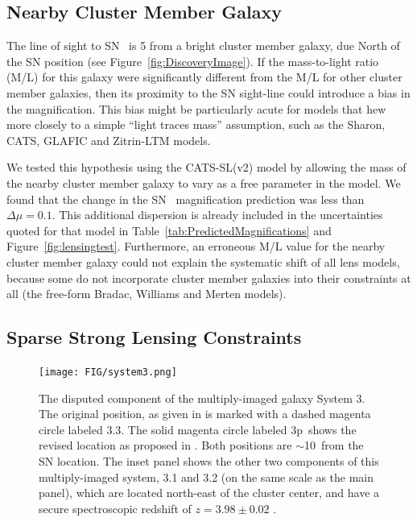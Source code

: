 \subsection{Nearby Cluster Member Galaxy}
\label{sec:NearbyClusterMemberGalaxy}

The line of sight to SN \tomas\ is 5 from a bright cluster
member galaxy, due North of the SN position (see
Figure~\ref{fig:DiscoveryImage}).  If the mass-to-light ratio (M/L)
for this galaxy were significantly different from the M/L for other
cluster member galaxies, then its proximity to the SN sight-line could
introduce a bias in the magnification.  This bias might be
particularly acute for models that hew more closely to a
simple ``light traces mass'' assumption, such as the Sharon, CATS,
GLAFIC and Zitrin-LTM models.

We tested this hypothesis using the CATS-SL(v2) model by allowing the mass
of the nearby cluster member galaxy to vary as a free parameter in the
model. We found that the change in the SN \tomas\ magnification
prediction was less than $\Delta\mu=0.1$.  This additional dispersion
is already included in the uncertainties quoted for that model in
Table~\ref{tab:PredictedMagnifications} and
Figure~\ref{fig:lensingtest}.  Furthermore, an erroneous M/L
value for the nearby cluster member galaxy could not explain the
systematic shift of all lens models, because some do not incorporate
cluster member galaxies into their constraints at all (the free-form
Bradac, Williams and Merten models).

\subsection{Sparse Strong Lensing Constraints}
\label{sec:SparseStrongLensingConstraints}

\begin{figure}
\begin{center}
\texttt{[image: FIG/system3.png]}
\caption{ 
The disputed component of the multiply-imaged galaxy System 3. The
original position, as given in \citet{Merten:2011} is marked with a
dashed magenta circle labeled 3.3. The solid magenta circle
labeled \33p\ shows the revised location as proposed
in \citet{Jauzac:2014c}.  Both positions are $\sim$10\arcsec\ from the
SN location.  The inset panel shows the other two components of this
multiply-imaged system, 3.1 and 3.2 (on the same scale as the main
panel), which are located north-east of the cluster center, and have a
secure spectroscopic redshift of $z=3.98\pm0.02$ \citep{Johnson:2014}.
\label{fig:system3} }
\end{center}
\end{figure}


